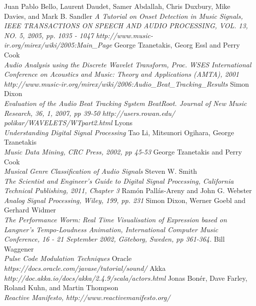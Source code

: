 \documentclass[a4paper, 11pt]{article}
\begin{document}
\begin{thebibliography}{99}
Juan Pablo Bello, Laurent Daudet, Samer Abdallah, Chris Duxbury, Mike Davies, and Mark B. Sandler 
\textit{A Tutorial on Onset Detection in Music Signals, IEEE TRANSACTIONS ON SPEECH AND AUDIO PROCESSING, VOL. 13, NO. 5, 2005, pp. 1035 - 1047}
\textit{http://www.music-ir.org/mirex/wiki/2005:Main\_Page}
George Tzanetakis, Georg Essl and Perry Cook\\
\textit{Audio Analysis using the Discrete Wavelet Transform, Proc. WSES International Conference on Acoustics and Music: Theory and Applications (AMTA), 2001}
\textit{http://www.music-ir.org/mirex/wiki/2006:Audio\_Beat\_Tracking\_Results}
Simon Dixon\\
\textit{Evaluation of the Audio Beat Tracking System BeatRoot. Journal of New Music Research, 36, 1, 2007, pp 39-50}
\textit{http://users.rowan.edu/ polikar/WAVELETS/WTpart2.html}
Lyons\\
\textit{Understanding Digital Signal Processing}
Tao Li, Mitsunori Ogihara, George Tzanetakis\\
\textit{Music Data Mining, CRC Press, 2002, pp 45-53}
George Tzanetakis and Perry Cook\\
\textit{Musical Genre Classification of Audio Signals}
Steven W. Smith\\
\textit{The Scientist and Engineer's Guide to Digital Signal Processing, California Technical Publishing, 2011, Chapter 3}
Ramón Pallás-Areny and John G. Webster\\
\textit{Analog Signal Processing, Wiley, 199, pp. 231}
Simon Dixon, Werner Goebl and Gerhard Widmer\\
\textit{The Performance Worm: Real Time Visualisation of Expression based on Langner’s Tempo-Loudness Animation, International Computer Music Conference, 16 - 21 September 2002, Göteborg, Sweden, pp 361-364.}
Bill Waggener\\
\textit{Pulse Code Modulation Techniques}
Oracle\\
\textit{https://docs.oracle.com/javase/tutorial/sound/}
Akka\\
\textit{http://doc.akka.io/docs/akka/2.4.9/scala/actors.html}
Jonas Bonér, Dave Farley, Roland Kuhn, and Martin Thompson\\
\textit{Reactive Manifesto, http://www.reactivemanifesto.org/}

\end{thebibliography}
\end{document}
